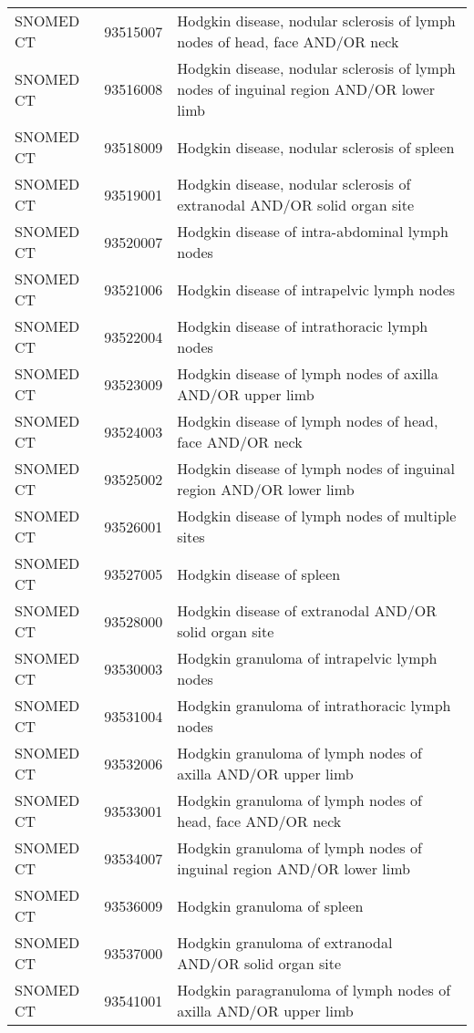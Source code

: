 \begin{table}[ht]
\begin{tabular}{lll}
  SNOMED CT & 93515007 & Hodgkin disease, nodular sclerosis of lymph nodes of head, face AND/OR neck \\ 
  SNOMED CT & 93516008 & Hodgkin disease, nodular sclerosis of lymph nodes of inguinal region AND/OR lower limb \\ 
  SNOMED CT & 93518009 & Hodgkin disease, nodular sclerosis of spleen \\ 
  SNOMED CT & 93519001 & Hodgkin disease, nodular sclerosis of extranodal AND/OR solid organ site \\ 
  SNOMED CT & 93520007 & Hodgkin disease of intra-abdominal lymph nodes \\ 
  SNOMED CT & 93521006 & Hodgkin disease of intrapelvic lymph nodes \\ 
  SNOMED CT & 93522004 & Hodgkin disease of intrathoracic lymph nodes \\ 
  SNOMED CT & 93523009 & Hodgkin disease of lymph nodes of axilla AND/OR upper limb \\ 
  SNOMED CT & 93524003 & Hodgkin disease of lymph nodes of head, face AND/OR neck \\ 
  SNOMED CT & 93525002 & Hodgkin disease of lymph nodes of inguinal region AND/OR lower limb \\ 
  SNOMED CT & 93526001 & Hodgkin disease of lymph nodes of multiple sites \\ 
  SNOMED CT & 93527005 & Hodgkin disease of spleen \\ 
  SNOMED CT & 93528000 & Hodgkin disease of extranodal AND/OR solid organ site \\ 
  SNOMED CT & 93530003 & Hodgkin granuloma of intrapelvic lymph nodes \\ 
  SNOMED CT & 93531004 & Hodgkin granuloma of intrathoracic lymph nodes \\ 
  SNOMED CT & 93532006 & Hodgkin granuloma of lymph nodes of axilla AND/OR upper limb \\ 
  SNOMED CT & 93533001 & Hodgkin granuloma of lymph nodes of head, face AND/OR neck \\ 
  SNOMED CT & 93534007 & Hodgkin granuloma of lymph nodes of inguinal region AND/OR lower limb \\ 
  SNOMED CT & 93536009 & Hodgkin granuloma of spleen \\ 
  SNOMED CT & 93537000 & Hodgkin granuloma of extranodal AND/OR solid organ site \\ 
  SNOMED CT & 93541001 & Hodgkin paragranuloma of lymph nodes of axilla AND/OR upper limb \\ 

\end{tabular}
\end{table}
